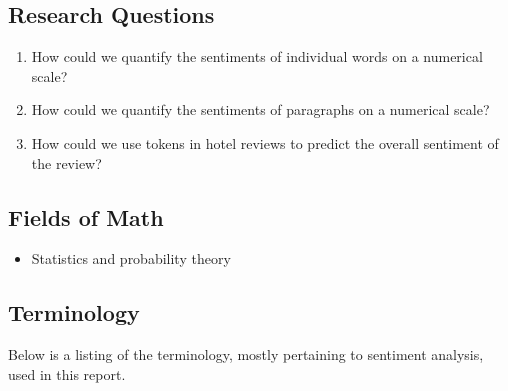 \documentclass[12pt, bibliography=totocnumbered, a4paper]{scrartcl}
\begin{document}
\subsection{Research Questions}
\begin{enumerate}
	\item How could we quantify the sentiments of individual words on a numerical scale?
	\item How could we quantify the sentiments of paragraphs on a numerical scale?
	\item How could we use tokens in hotel reviews to predict the overall sentiment of the review?
\end{enumerate}

\subsection{Fields of Math}
\begin{itemize}
	\item Statistics and probability theory
\end{itemize}

\subsection{Terminology}
Below is a listing of the terminology, mostly pertaining to sentiment
analysis, used in this report.
\end{document}
